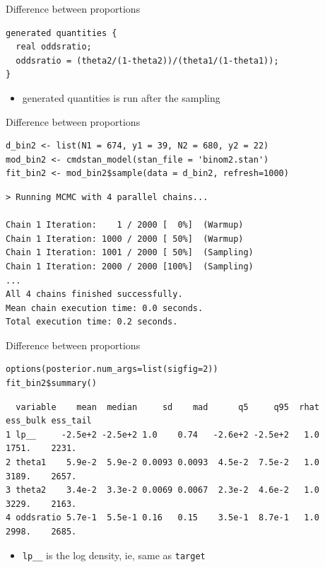 \documentclass[finnish,english,t]{beamer}
\begin{document}
\begin{frame}[fragile]{Difference between proportions}

  
  {\small
\begin{verbatim}
generated quantities {
  real oddsratio;
  oddsratio = (theta2/(1-theta2))/(theta1/(1-theta1));
}
\end{verbatim}
    }

    \begin{itemize}
    \item generated quantities is run after the sampling
    \end{itemize}
    
\end{frame}

\begin{frame}[fragile]{Difference between proportions}
  
  {\small
\begin{verbatim}
d_bin2 <- list(N1 = 674, y1 = 39, N2 = 680, y2 = 22)
mod_bin2 <- cmdstan_model(stan_file = 'binom2.stan')
fit_bin2 <- mod_bin2$sample(data = d_bin2, refresh=1000)
\end{verbatim}
  }

  {\footnotesize
\begin{verbatim}
> Running MCMC with 4 parallel chains...

Chain 1 Iteration:    1 / 2000 [  0%]  (Warmup) 
Chain 1 Iteration: 1000 / 2000 [ 50%]  (Warmup) 
Chain 1 Iteration: 1001 / 2000 [ 50%]  (Sampling) 
Chain 1 Iteration: 2000 / 2000 [100%]  (Sampling) 
...
All 4 chains finished successfully.
Mean chain execution time: 0.0 seconds.
Total execution time: 0.2 seconds.
\end{verbatim}
  }

\end{frame}

\begin{frame}[fragile]{Difference between proportions}
  
  {\small
\begin{verbatim}
options(posterior.num_args=list(sigfig=2))
fit_bin2$summary()
\end{verbatim}
  }

  {\scriptsize
\begin{verbatim}
  variable    mean  median     sd    mad      q5     q95  rhat ess_bulk ess_tail
1 lp__     -2.5e+2 -2.5e+2 1.0    0.74   -2.6e+2 -2.5e+2   1.0    1751.    2231.
2 theta1    5.9e-2  5.9e-2 0.0093 0.0093  4.5e-2  7.5e-2   1.0    3189.    2657.
3 theta2    3.4e-2  3.3e-2 0.0069 0.0067  2.3e-2  4.6e-2   1.0    3229.    2163.
4 oddsratio 5.7e-1  5.5e-1 0.16   0.15    3.5e-1  8.7e-1   1.0    2998.    2685.
\end{verbatim}
  }

  \begin{itemize}
  \item<2-> {\tt lp\_\_} is the log density, ie, same as {\tt target}
  \end{itemize}

\end{frame}
\end{document}
